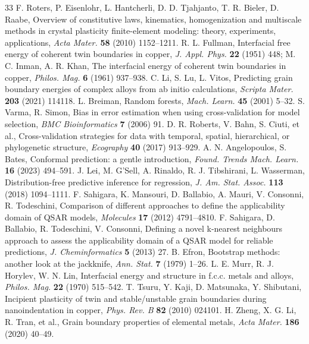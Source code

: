 \documentclass[11pt]{article}
\begin{document}
\begin{thebibliography}{33}
 F. Roters, P. Eisenlohr, L. Hantcherli, D. D. Tjahjanto, T. R. Bieler, D. Raabe, Overview of constitutive laws, kinematics, homogenization and multiscale methods in crystal plasticity finite-element modeling: theory, experiments, applications, \textit{Acta Mater.} \textbf{58} (2010) 1152--1211.
 R. L. Fullman, Interfacial free energy of coherent twin boundaries in copper, \textit{J. Appl. Phys.} \textbf{22} (1951) 448; M. C. Inman, A. R. Khan, The interfacial energy of coherent twin boundaries in copper, \textit{Philos. Mag.} \textbf{6} (1961) 937--938.
 C. Li, S. Lu, L. Vitos, Predicting grain boundary energies of complex alloys from ab initio calculations, \textit{Scripta Mater.} \textbf{203} (2021) 114118.
 L. Breiman, Random forests, \textit{Mach. Learn.} \textbf{45} (2001) 5--32.
 S. Varma, R. Simon, Bias in error estimation when using cross-validation for model selection, \textit{BMC Bioinformatics} \textbf{7} (2006) 91.
 D. R. Roberts, V. Bahn, S. Ciuti, et al., Cross-validation strategies for data with temporal, spatial, hierarchical, or phylogenetic structure, \textit{Ecography} \textbf{40} (2017) 913--929.
 A. N. Angelopoulos, S. Bates, Conformal prediction: a gentle introduction, \textit{Found. Trends Mach. Learn.} \textbf{16} (2023) 494--591.
 J. Lei, M. G'Sell, A. Rinaldo, R. J. Tibshirani, L. Wasserman, Distribution-free predictive inference for regression, \textit{J. Am. Stat. Assoc.} \textbf{113} (2018) 1094--1111.
 F. Sahigara, K. Mansouri, D. Ballabio, A. Mauri, V. Consonni, R. Todeschini, Comparison of different approaches to define the applicability domain of QSAR models, \textit{Molecules} \textbf{17} (2012) 4791--4810.
 F. Sahigara, D. Ballabio, R. Todeschini, V. Consonni, Defining a novel k-nearest neighbours approach to assess the applicability domain of a QSAR model for reliable predictions, \textit{J. Cheminformatics} \textbf{5} (2013) 27.
 B. Efron, Bootstrap methods: another look at the jackknife, \textit{Ann. Stat.} \textbf{7} (1979) 1--26.
 L. E. Murr, R. J. Horylev, W. N. Lin, Interfacial energy and structure in f.c.c. metals and alloys, \textit{Philos. Mag.} \textbf{22} (1970) 515--542.
 T. Tsuru, Y. Kaji, D. Matsunaka, Y. Shibutani, Incipient plasticity of twin and stable/unstable grain boundaries during nanoindentation in copper, \textit{Phys. Rev. B} \textbf{82} (2010) 024101.
 H. Zheng, X. G. Li, R. Tran, et al., Grain boundary properties of elemental metals, \textit{Acta Mater.} \textbf{186} (2020) 40--49.

\end{thebibliography}
\end{document}

